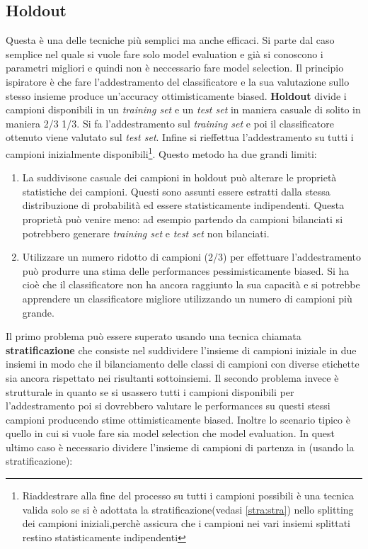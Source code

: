 \subsection{Holdout}
Questa è una delle tecniche più semplici ma anche efficaci. Si parte dal caso semplice nel quale si vuole fare solo model evaluation e già si conoscono i parametri migliori e quindi non è neccessario fare model selection. Il principio ispiratore è che fare l'addestramento del classificatore e la sua valutazione sullo stesso insieme produce un'accuracy ottimisticamente biased. \textbf{Holdout} divide i campioni disponibili in un \textit{training set} e un \textit{test set} in maniera casuale di solito in maniera 2/3 1/3. Si fa l'addestramento sul \textit{training set} e poi il classificatore ottenuto viene valutato sul \textit{test set}. Infine si rieffettua l'addestramento su tutti i campioni inizialmente disponibili\footnote{Riaddestrare alla fine del processo su tutti i campioni possibili è una tecnica valida solo se si è adottata la stratificazione(vedasi \ref{stra:stra}) nello splitting dei campioni iniziali,perchè assicura che i campioni nei vari insiemi splittati restino statisticamente indipendenti}. Questo metodo ha due grandi limiti:
\begin{enumerate}
\item La suddivisone casuale dei campioni in holdout può alterare le proprietà statistiche dei campioni. Questi sono assunti essere estratti dalla stessa distribuzione di probabilità ed essere statisticamente indipendenti. Questa proprietà può venire meno: ad esempio partendo da campioni bilanciati si potrebbero generare \textit{training set} e \textit{test set} non bilanciati.
\item \label{item:holdlim} Utilizzare un numero ridotto di campioni (2/3) per effettuare l'addestramento può produrre una stima delle performances pessimisticamente biased. Si ha cioè che il classificatore non ha ancora raggiunto la sua capacità e si potrebbe apprendere un classificatore migliore utilizzando un numero di campioni più grande. 
\end{enumerate}
Il primo problema può essere superato usando una tecnica chiamata
\label{stra:stra} \textbf{stratificazione} che consiste nel suddividere l'insieme di campioni iniziale in due insiemi in modo che il bilanciamento delle classi di campioni con diverse etichette sia ancora rispettato nei risultanti sottoinsiemi. Il secondo problema invece è strutturale in quanto se si usassero tutti i campioni disponibili per l'addestramento poi si dovrebbero valutare le performances su questi stessi campioni producendo stime ottimisticamente biased. Inoltre lo scenario tipico è quello in cui si vuole fare sia model selection che model evaluation. In quest ultimo caso è necessario dividere l'insieme di campioni di partenza in (usando la stratificazione):
